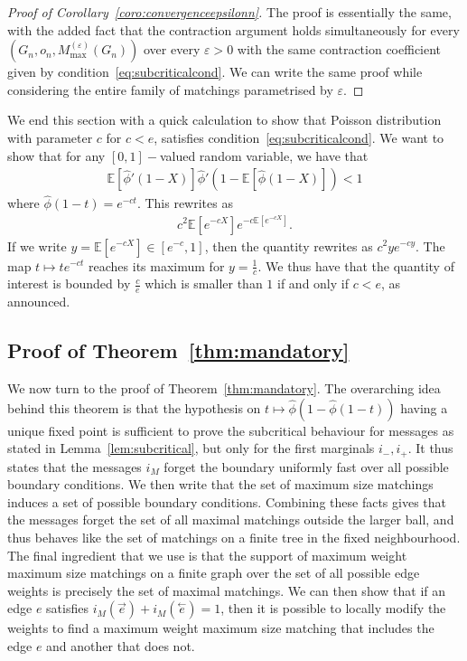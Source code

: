 \documentclass[11pt]{article}
\newcommand{\eps}{\varepsilon}
\begin{document}
\begin{proof}[Proof of Corollary~\ref{coro:convergenceepsilonn}]
    The proof is essentially the same, with the added fact that the contraction argument holds simultaneously for every $(G_n,o_n,M_{\max}^{(\eps)}(G_n))$ over every $\eps>0$ with the same contraction coefficient given by condition~\eqref{eq:subcriticalcond}. We can write the same proof while considering the entire family of matchings parametrised by $\eps$.
\end{proof}

\bigskip


We end this section with a quick calculation to show that Poisson distribution with parameter $c$ for $c<e$, satisfies condition~\eqref{eq:subcriticalcond}.
We want to show that for any $[0,1]-$valued random variable, we have that
\begin{align*}
    \mathbb{E}\left[\hat{\phi}'(1-X)\right]\hat{\phi}'\left(1-\mathbb{E}\left[\hat{\phi}(1-X)\right]\right) <1
\end{align*}
where $\hat{\phi}(1-t)=e^{-ct}$.
This rewrites as
\begin{align*}
    c^2\mathbb{E}[e^{-cX}]e^{-c\mathbb{E}[e^{-cX}]}.
\end{align*}
If we write $y=\mathbb{E}[e^{-cX}] \in [e^{-c},1]$, then the quantity rewrites as $c^2ye^{-cy}$.
The map $t \mapsto te^{-ct}$ reaches its maximum for $y=\frac{1}{c}$. We thus have that the quantity of interest is bounded by
$\frac{c}{e}$
which is smaller than $1$ if and only if $c<e$, as announced.
\subsection{Proof of Theorem~\ref{thm:mandatory}}
We now turn to the proof of Theorem~\ref{thm:mandatory}. The overarching idea behind this theorem is that the hypothesis on $t \mapsto \hat{\phi}(1-\hat{\phi}(1-t))$ having a unique fixed point is sufficient to prove the subcritical behaviour for messages as stated in Lemma~\ref{lem:subcritical}, but only for the first marginals $i_-,i_+$. It thus states that the messages $i_M$ forget the boundary uniformly fast over all possible boundary conditions. We then write that the set of maximum size matchings induces a set of possible boundary conditions. Combining these facts gives that the messages forget the set of all maximal matchings outside the larger ball, and thus behaves like the set of matchings on a finite tree in the fixed neighbourhood. The final ingredient that we use is that the support of maximum weight maximum size matchings on a finite graph over the set of all possible edge weights is precisely the set of maximal matchings. We can then show that if an edge $e$ satisfies $i_M(\overset{\rightarrow}{e})+i_M(\overset{\leftarrow}{e})=1$, then it is possible to locally modify the weights to find a maximum weight maximum size matching that includes the edge $e$ and another that does not.
\end{document}
